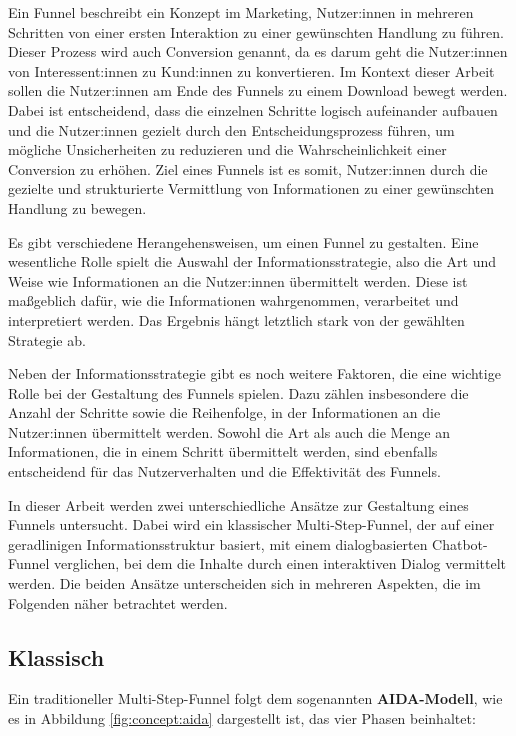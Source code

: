 Ein Funnel beschreibt ein Konzept im Marketing, Nutzer:innen in mehreren Schritten
von einer ersten Interaktion zu einer gewünschten Handlung zu führen.
Dieser Prozess wird auch Conversion genannt, da es darum geht die Nutzer:innen
von Interessent:innen zu Kund:innen zu konvertieren.
Im Kontext dieser Arbeit sollen die Nutzer:innen am Ende des Funnels zu einem Download bewegt werden.
Dabei ist entscheidend, dass die einzelnen Schritte logisch aufeinander aufbauen und die
Nutzer:innen gezielt durch den Entscheidungsprozess führen, um mögliche Unsicherheiten zu
reduzieren und die Wahrscheinlichkeit einer Conversion zu erhöhen. Ziel eines Funnels
ist es somit, Nutzer:innen durch die gezielte und strukturierte Vermittlung von Informationen zu einer
gewünschten Handlung zu bewegen.

Es gibt verschiedene Herangehensweisen, um einen Funnel zu gestalten.
Eine wesentliche Rolle spielt die Auswahl der Informationsstrategie, also die Art
und Weise wie Informationen an die Nutzer:innen übermittelt werden. Diese ist
maßgeblich dafür, wie die Informationen wahrgenommen, verarbeitet und interpretiert werden.
Das Ergebnis hängt letztlich stark von der gewählten Strategie ab.

Neben der Informationsstrategie gibt es noch weitere Faktoren, die eine wichtige Rolle bei der Gestaltung
des Funnels spielen. Dazu zählen insbesondere die Anzahl der Schritte sowie
die Reihenfolge, in der Informationen an die Nutzer:innen übermittelt werden.
Sowohl die Art als auch die Menge an Informationen, die in einem Schritt übermittelt
werden, sind ebenfalls entscheidend für das Nutzerverhalten und die Effektivität des Funnels.

In dieser Arbeit werden zwei unterschiedliche Ansätze zur Gestaltung eines Funnels untersucht.
Dabei wird ein klassischer Multi-Step-Funnel, der auf einer geradlinigen Informationsstruktur basiert,
mit einem dialogbasierten Chatbot-Funnel verglichen, bei dem die Inhalte durch einen
interaktiven Dialog vermittelt werden.
Die beiden Ansätze unterscheiden sich in mehreren Aspekten, die im Folgenden näher betrachtet werden.

\setauthor{\firstauthor}
\subsection{Klassisch}

Ein traditioneller Multi-Step-Funnel folgt dem sogenannten \textbf{AIDA-Modell}, 
wie es in Abbildung \ref{fig:concept:aida} dargestellt ist, das vier Phasen
beinhaltet:

